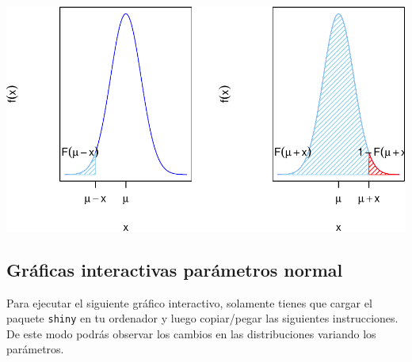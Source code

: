 \documentclass[]{book}
\begin{document}
\begin{center}\includegraphics{curso-probabilidad-udemy_files/figure-latex/unnamed-chunk-96-1} \end{center}

\hypertarget{gruxe1ficas-interactivas-paruxe1metros-normal}{%
\subsection{Gráficas interactivas parámetros normal}\label{gruxe1ficas-interactivas-paruxe1metros-normal}}

Para ejecutar el siguiente gráfico interactivo, solamente tienes que cargar el paquete \texttt{shiny} en tu ordenador y luego copiar/pegar las siguientes instrucciones. De este modo podrás observar los cambios en las distribuciones variando los parámetros.
\end{document}
